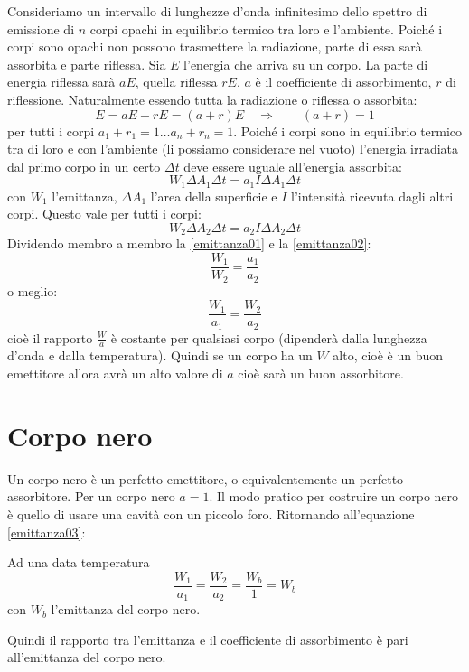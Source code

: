 Consideriamo un intervallo di lunghezze d'onda infinitesimo dello spettro di emissione di $n$ corpi opachi in equilibrio termico tra loro e l'ambiente. Poiché i corpi sono opachi non possono trasmettere la radiazione, parte di essa sarà assorbita e parte riflessa. Sia $E$ l'energia che arriva su un corpo. La parte di energia riflessa sarà $aE$, quella riflessa $rE$. $a$ è il coefficiente di assorbimento, $r$ di riflessione. Naturalmente essendo tutta la radiazione o riflessa o assorbita:
\begin{equation}
	E=aE+rE=(a+r)E\quad\Rightarrow \qquad(a+r)=1
\end{equation}
per tutti i corpi $a_1+r_1=1\ldots a_n+r_n=1$. Poiché i corpi sono in equilibrio termico tra di loro e con l'ambiente (li possiamo considerare nel vuoto) l'energia irradiata dal primo corpo in un certo $\Delta t$ deve essere uguale all'energia assorbita:
\begin{equation}
	W_1\Delta A_1\Delta t=a_1I\Delta A_1\Delta t
	\label{emittanza01}
\end{equation}
con $W_1$ l'emittanza, $\Delta A_1$ l'area della superficie e $I$ l'intensità ricevuta dagli altri corpi. Questo vale per tutti i corpi:
\begin{equation}
	W_2\Delta A_2\Delta t=a_2I\Delta A_2\Delta t
	\label{emittanza02}
\end{equation}
Dividendo membro a membro la \eqref{emittanza01} e la \eqref{emittanza02}:
\begin{equation}
	\frac{W_1}{W_2}=\frac{a_1}{a_2}
\end{equation}
o meglio:
\begin{equation}
	\frac{W_1}{a_1}=\frac{W_2}{a_2}
	\label{emittanza03}
\end{equation}
cioè il rapporto $\frac{W}{a}$ è costante per qualsiasi corpo (dipenderà dalla lunghezza d'onda e dalla temperatura). Quindi se un corpo ha un $W$ alto, cioè è un buon emettitore allora avrà un alto valore di $a$ cioè sarà un buon assorbitore.
\section{Corpo nero}
Un corpo nero è un perfetto emettitore, o equivalentemente un perfetto assorbitore. Per un corpo nero $a=1$. Il modo pratico per costruire un corpo nero è quello di usare una cavità con un piccolo foro. Ritornando all'equazione \eqref{emittanza03}:
\begin{legge}
	Ad una data temperatura
	\begin{equation}
		\frac{W_1}{a_1}=\frac{W_2}{a_2}=\frac{W_b}{1}=W_b
	\end{equation}
	con $W_b$ l'emittanza del corpo nero.
\end{legge}
Quindi il rapporto tra l'emittanza e il coefficiente di assorbimento è pari all'emittanza del corpo nero.
